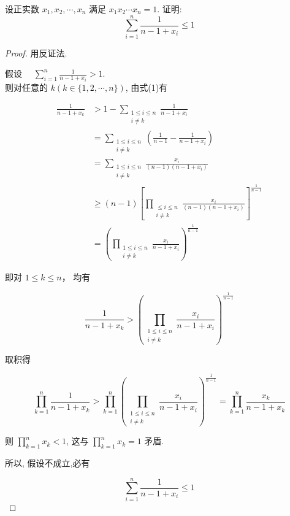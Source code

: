 \begin{example}
	设正实数 $x_{1}, x_{2}, \cdots, x_{n}$ 满足 $x_{1} x_{2} \cdots x_{n}=1$. 证明:
	$$
	\sum_{i=1}^{n} \frac{1}{n-1+x_{i}} \leqslant 1
	$$
\end{example}
\begin{proof}
	用反证法.
	
	假设 $\quad \sum_{i=1}^{n} \frac{1}{n-1+x_{i}}>1$.\\
	则对任意的 $k(k \in\{1,2, \cdots, n\})$, 由式(1)有
	
	$$
	\begin{aligned}
	\frac{1}{n-1+x_{k}} & >1-\sum_{\substack{1 \leqslant i \leqslant n \\
	i \neq k}} \frac{1}{n-1+x_{i}} \\
	& =\sum_{\substack{1 \leqslant i \leqslant n \\
	i \neq k}}\left(\frac{1}{n-1}-\frac{1}{n-1+x_{i}}\right) \\
	& =\sum_{\substack{1 \leqslant i \leqslant n \\
	i \neq k}} \frac{x_{i}}{(n-1)\left(n-1+x_{i}\right)} \\
	& \geqslant(n-1)\left[\prod_{\substack{\leqslant i \leqslant n \\
	i \neq k}} \frac{x_{i}}{(n-1)\left(n-1+x_{i}\right)}\right]^{\frac{1}{n-1}} \\
	& =\left(\prod_{\substack{1 \leq i \leq n \\
	i \neq k}} \frac{x_{i}}{n-1+x_{i}}\right)^{\frac{1}{n-1}}
	\end{aligned}
	$$
	
	即对 $1 \leqslant k \leqslant n ，$ 均有
	
	$$
	\frac{1}{n-1+x_{k}}>\left(\prod_{\substack{1 \leq i \leq n \\ i \neq k}} \frac{x_{i}}{n-1+x_{i}}\right)^{\frac{1}{n-1}}
	$$
	
	取积得
	
	$$
	\prod_{k=1}^{n} \frac{1}{n-1+x_{k}}>\prod_{k=1}^{n}\left(\prod_{\substack{1 \leqslant i \leqslant n \\ i \neq k}} \frac{x_{i}}{n-1+x_{i}}\right)^{\frac{1}{n-1}}=\prod_{k=1}^{n} \frac{x_{k}}{n-1+x_{k}}
	$$
	
	则 $\prod_{k=1}^{n} x_{k}<1$, 这与 $\prod_{k=1}^{n} x_{k}=1$ 矛盾.
	
	所以, 假设不成立,必有
	
	$$
	\sum_{i=1}^{n} \frac{1}{n-1+x_{i}} \leqslant 1
	$$
\end{proof}
